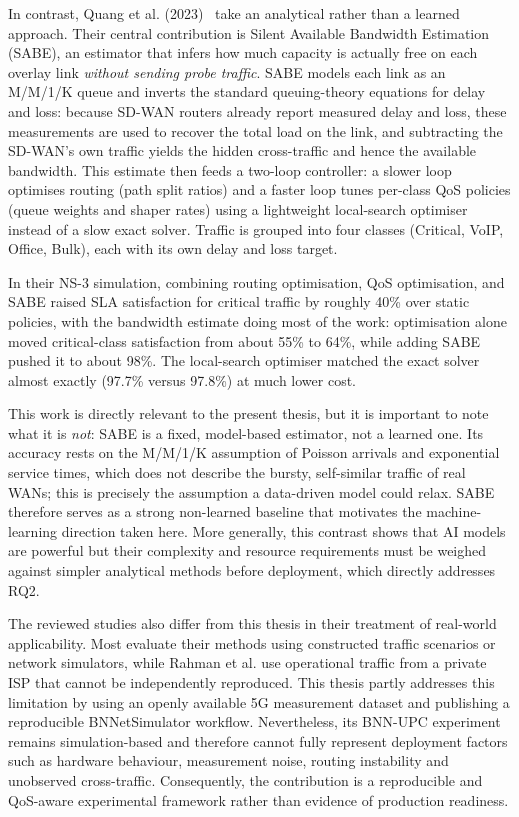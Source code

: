 \documentclass[a4paper,12pt]{Classes/RoboticsLaTeX}
\begin{document}
In contrast, Quang et al. (2023)~\cite{quang2023globalqos} take an analytical rather than a learned approach. Their central contribution is Silent Available Bandwidth Estimation (SABE), an estimator that infers how much capacity is actually free on each overlay link \emph{without sending probe traffic}. SABE models each link as an M/M/1/K queue and inverts the standard queuing-theory equations for delay and loss: because SD-WAN routers already report measured delay and loss, these measurements are used to recover the total load on the link, and subtracting the SD-WAN's own traffic yields the hidden cross-traffic and hence the available bandwidth. This estimate then feeds a two-loop controller: a slower loop optimises routing (path split ratios) and a faster loop tunes per-class QoS policies (queue weights and shaper rates) using a lightweight local-search optimiser instead of a slow exact solver. Traffic is grouped into four classes (Critical, VoIP, Office, Bulk), each with its own delay and loss target.

In their NS-3 simulation, combining routing optimisation, QoS optimisation, and SABE raised SLA satisfaction for critical traffic by roughly 40\% over static policies, with the bandwidth estimate doing most of the work: optimisation alone moved critical-class satisfaction from about 55\% to 64\%, while adding SABE pushed it to about 98\%. The local-search optimiser matched the exact solver almost exactly (97.7\% versus 97.8\%) at much lower cost.

This work is directly relevant to the present thesis, but it is important to note what it is \emph{not}: SABE is a fixed, model-based estimator, not a learned one. Its accuracy rests on the M/M/1/K assumption of Poisson arrivals and exponential service times, which does not describe the bursty, self-similar traffic of real WANs; this is precisely the assumption a data-driven model could relax. SABE therefore serves as a strong non-learned baseline that motivates the machine-learning direction taken here. More generally, this contrast shows that AI models are powerful but their complexity and resource requirements must be weighed against simpler analytical methods before deployment, which directly addresses RQ2.

The reviewed studies also differ from this thesis in their treatment of real-world applicability. Most evaluate their methods using constructed traffic scenarios or network simulators, while Rahman et al. use operational traffic from a private ISP that cannot be independently reproduced. This thesis partly addresses this limitation by using an openly available 5G measurement dataset and publishing a reproducible BNNetSimulator workflow. Nevertheless, its BNN-UPC experiment remains simulation-based and therefore cannot fully represent deployment factors such as hardware behaviour, measurement noise, routing instability and unobserved cross-traffic. Consequently, the contribution is a reproducible and QoS-aware experimental framework rather than evidence of production readiness.
\end{document}
